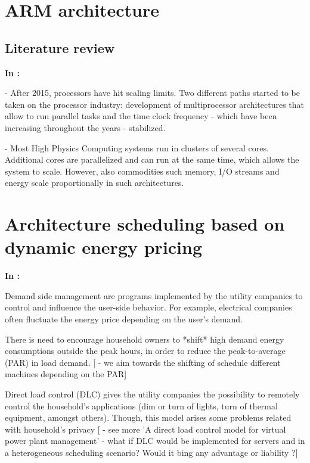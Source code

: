 \section{ARM architecture}
\subsection{Literature review}


\textbf{In \cite{ACAT13ARM}:}

- After 2015, processors have hit scaling limits. Two different paths started to be
taken on the processor industry:  development of multiprocessor architectures that
allow to run parallel tasks and the time clock frequency - which have been
increasing throughout the years - stabilized.

- Most High Physics Computing systems run in clusters of several cores.
Additional cores are parallelized and can run at the same time, which allows the
system to scale. However, also commodities such memory, I/O streams and energy
scale proportionally in such architectures.
 



\section{Architecture scheduling based on dynamic energy pricing}

\textbf{In \cite{FUTURE_SMART_GRID}:}

Demand side management are programs implemented by the utility companies to
control and influence the user-side behavior. For example, electrical companies
often fluctuate the energy price depending on the user's demand.

There is need to encourage household owners to *shift* high demand energy
consumptions outside the peak hours, in order to reduce the peak-to-average
(PAR) in load demand.
[ - we aim towards the shifting of schedule different machines  depending on the PAR] 

Direct load control (DLC) gives the utility companies the possibility to
remotely control the household's applications (dim or turn of lights, turn of
thermal equipment, amongst others). Though, this model arises some problems
related with household's privacy
[ - see more  'A direct load control model for virtual power plant management'
  - what if DLC would be implemented for servers and in a heterogeneous
    scheduling scenario? Would it bing any advantage or liability ?]


